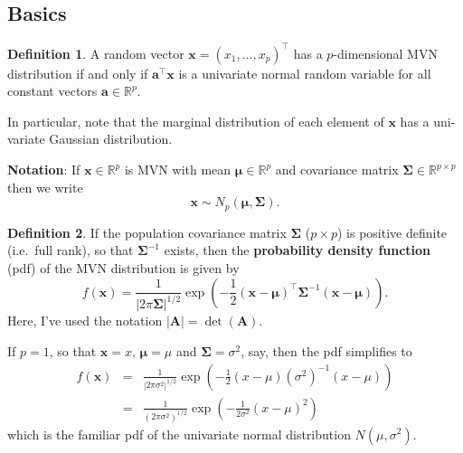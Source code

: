 \documentclass[
]{book}
\theoremstyle{definition}
\newtheorem{definition}{Definition}[chapter]
\theoremstyle{definition}
\theoremstyle{definition}
\theoremstyle{definition}
\theoremstyle{remark}
\begin{document}
\hypertarget{basics}{%
\subsection{Basics}\label{basics}}

\begin{definition}
\protect\hypertarget{def:mvn}{}\label{def:mvn}A random vector \(\mathbf x=(x_1, \ldots , x_p)^\top\) has a \(p\)-dimensional MVN distribution if and only if \(\mathbf a^\top \mathbf x\) is a univariate normal random variable for all constant vectors \(\mathbf a\in \mathbb{R}^p\).
\end{definition}

In particular, note that the marginal distribution of each element of \(\mathbf x\) has a uni-variate Gaussian distribution.

\textbf{Notation}: \quad If \(\mathbf x\in \mathbb{R}^p\) is MVN with mean \({\boldsymbol{\mu}}\in \mathbb{R}^p\) and covariance matrix \(\boldsymbol{\Sigma}\in \mathbb{R}^{p\times p}\) then we write
\[ \mathbf x\sim N_p ({\boldsymbol{\mu}}, \boldsymbol{\Sigma}).\]

\begin{definition}
\protect\hypertarget{def:mvnpdf}{}\label{def:mvnpdf}If the population covariance matrix \(\boldsymbol{\Sigma}\) (\(p \times p\)) is positive definite (i.e.~full rank), so that \(\boldsymbol{\Sigma}^{-1}\) exists,
then the \textbf{probability density function} (pdf) of the MVN distribution is given by
\[ f(\mathbf x) = \frac{1}{| 2 \pi \boldsymbol{\Sigma}|^{1/2}} \exp \left(-\frac{1}{2}(\mathbf x- {\boldsymbol{\mu}})^\top \boldsymbol{\Sigma}^{-1} (\mathbf x- {\boldsymbol{\mu}}) \right).\]
Here, I've used the notation \(|\mathbf A| = \det(\mathbf A)\).
\end{definition}

If \(p=1\), so that \(\mathbf x= x\), \({\boldsymbol{\mu}}= \mu\) and \(\boldsymbol{\Sigma}= \sigma^2\), say, then the pdf simplifies to
\begin{eqnarray*}
f(\mathbf x) &=& \frac{1}{|2 \pi \sigma^2|^{1/2}} \exp \left(-\frac{1}{2}(x - \mu) (\sigma^2)^{-1} (x - \mu) \right)\\
&=& \frac{1}{(2 \pi \sigma^2)^{1/2}} \exp \left(-\frac{1}{2 \sigma^2}(x - \mu)^2 \right)
\end{eqnarray*}
which is the familiar pdf of the univariate normal distribution \(N(\mu,\sigma^2)\).
\end{document}
